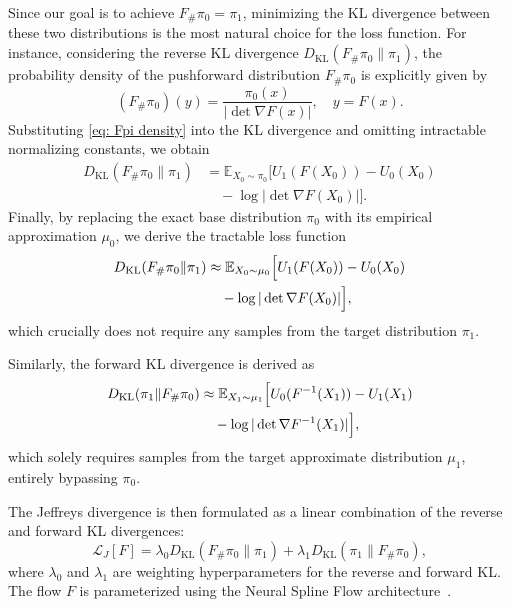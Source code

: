 \documentclass[%
 reprint,
 amsmath,amssymb,
 aps,
 pre,
]{revtex4-2}
\DeclareMathOperator{\KL}{KL}
\begin{document}
Since our goal is to achieve $F_{\#} \pi_0 = \pi_1$, minimizing the KL divergence between these two distributions is the most natural choice for the loss function. For instance, considering the reverse KL divergence $D_{\KL}(F_\#\pi_0\|\pi_1)$, the probability density of the pushforward distribution $F_{\#} \pi_0$ is explicitly given by
\begin{equation}
	(F_\# \pi_0)(y) = \frac{\pi_0(x)}{|\det \nabla F(x)|},\quad y = F(x).
	\label{eq: Fpi density}
\end{equation}
Substituting \eqref{eq: Fpi density} into the KL divergence and omitting intractable normalizing constants, we obtain
\begin{align*}
	D_{\KL}(F_\#\pi_0\|\pi_1) &= \mathbb E_{X_0 \sim \pi_0} \Big[ U_1(F(X_0)) - U_0(X_0) \\
	&\quad - \log|\det\nabla F(X_0)| \Big].
\end{align*}
Finally, by replacing the exact base distribution $\pi_0$ with its empirical approximation $\mu_0$, we derive the tractable loss function
\begin{align}
	D_{\KL}(F_\#\pi_0\|\pi_1) &\approx \mathbb E_{X_0 \sim \mu_0} \Big[ U_1(F(X_0)) - U_0(X_0) \notag \\
	&\quad - \log|\det\nabla F(X_0)| \Big],
	\label{eq: rKL}
\end{align}
which crucially does not require any samples from the target distribution $\pi_1$.

Similarly, the forward KL divergence is derived as
\begin{align}
	D_{\KL}(\pi_1\|F_\#\pi_0) 
	&\approx \mathbb E_{X_1 \sim \mu_1} \Big[ U_0(F^{-1}(X_1)) - U_1(X_1) \notag \\
	&\quad - \log|\det\nabla F^{-1}(X_1)| \Big],
	\label{eq: fKL}
\end{align}
which solely requires samples from the target approximate distribution $\mu_1$, entirely bypassing $\pi_0$. 

The Jeffreys divergence is then formulated as a linear combination of the reverse and forward KL divergences:
\begin{equation}
	\mathcal L_J[F] = \lambda_0 D_{\KL}(F_\#\pi_0\|\pi_1) + \lambda_1 D_{\KL}(\pi_1\|F_\#\pi_0),
	\label{eq: Jdiv}
\end{equation}
where $\lambda_0$ and $\lambda_1$ are weighting hyperparameters for the reverse and forward KL. The flow $F$ is parameterized using the Neural Spline Flow architecture~\cite{durkan2019neural}.
\end{document}
